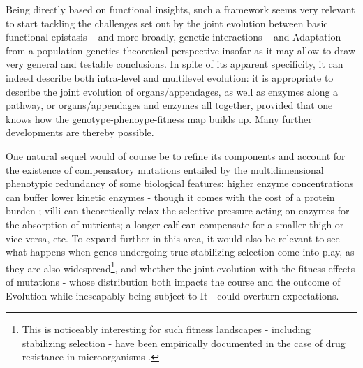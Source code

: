 Being directly based on functional insights, such a framework seems very relevant to start tackling the challenges set out by the joint evolution between basic functional epistasis -- and more broadly, genetic interactions -- and Adaptation from a population genetics theoretical perspective insofar as it may allow to draw very general and testable conclusions. In spite of its apparent specificity, it can indeed describe both intra-level and multilevel evolution: it is appropriate to describe the joint evolution of organs/appendages, as well as enzymes along a pathway, or organs/appendages and enzymes all together, provided that one knows how the genotype-phenoype-fitness map builds up. Many further developments are thereby possible.

One natural sequel would of course be to refine its components and account for the existence of compensatory mutations entailed by the multidimensional phenotypic redundancy of some biological features: higher enzyme concentrations can buffer lower kinetic enzymes - though it comes with the cost of a protein burden \citep{Koch83,Dill11,Kafri16}; villi can theoretically relax the selective pressure acting on enzymes for the absorption of nutrients; a longer calf can compensate for a smaller thigh or vice-versa, etc. To expand further in this area, it would also be relevant to see what happens when genes undergoing true stabilizing selection come into play, as they are also widespread\footnote{This is noticeably interesting for such fitness landscapes - including stabilizing selection - have been empirically documented in the case of drug resistance in microorganisms \citep{Ford20}.}\citep{Sella19}, and whether the joint evolution with the fitness effects of mutations - whose distribution both impacts the course and the outcome of Evolution while inescapably being subject to It - could overturn expectations.

